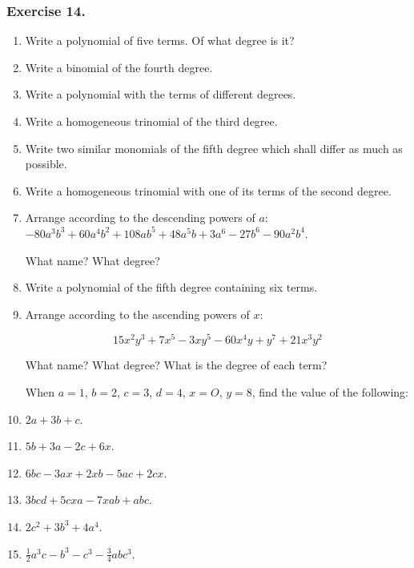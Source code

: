 \documentclass{book}
\begin{document}
\subsubsection*{Exercise 14.}
\begin{enumerate}
\item Write a polynomial of five terms. Of what degree is it?

\item Write a binomial of the fourth degree.

\item Write a polynomial with the terms of different degrees.

\item Write a homogeneous trinomial of the third degree.

\item Write two similar monomials of the fifth degree which shall
differ as much as possible.

\item Write a homogeneous trinomial with one of its terms of the
second degree.

\item Arrange according to the descending powers of $a$:
$-80a^3b^3 + 60a^4b^2 + 108ab^5 + 48a^5b + 3a^6 - 27b^6 -
90a^2b^4$.

What name? What degree?

\item Write a polynomial of the fifth degree containing six terms.

\item Arrange according to the ascending powers of $x$:

\[ 15x^2y^3 + 7x^5 - 3xy^5 - 60x^4y + y^7 + 21x^3y^2 \]

What name? What degree? What is the degree of
each term?

When $a = 1$, $b = 2$, $c = 3$, $d = 4$, $x = O$, $y = 8$, find
the value of the following:

\item $2a + 3b + c$.

\item $5b + 3a - 2c + 6x$.

\item $6bc - 3ax + 2xb - 5ac + 2cx$.

\item $3bcd + 5cxa - 7xab + abc$.

\item $2c^2 + 3b^3 + 4a^4$.

\item $\frac{1}{2}a^3c - b^3 - c^3 - \frac{3}{4}abc^3$.


\end{enumerate}
\end{document}
